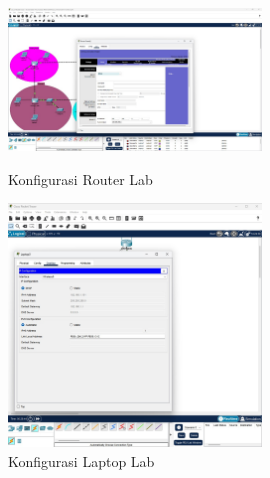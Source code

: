 \begin{figure}[h!]
    \centering
    \begin{minipage}{0.48\textwidth}
        \centering
        \includegraphics[width=0.6\textwidth]{img/Lab_R.jpeg}        \caption*{Konfigurasi Router Lab}
        \label{fig:cfg_router_lab}
    \end{minipage}\hfill
    \begin{minipage}{0.48\textwidth}
        \centering
        \includegraphics[width=0.6\textwidth]{img/Lab_L.jpeg}
        \caption*{Konfigurasi Laptop Lab}
        \label{fig:cfg_laptop_lab}
    \end{minipage}
\end{figure}
\clearpage 

